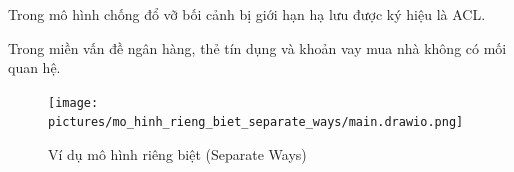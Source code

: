 Trong mô hình chống đổ vỡ bối cảnh bị giới hạn hạ lưu được ký hiệu là ACL.



















\begin{example} Trong miền vấn đề ngân hàng, thẻ tín dụng và khoản vay mua nhà không có mối quan hệ.

    \begin{figure}[H]

        \centering

        \texttt{[image: pictures/mo\_hinh\_rieng\_biet\_separate\_ways/main.drawio.png]}

        \caption{Ví dụ mô hình riêng biệt (Separate Ways)}

    \end{figure}

\end{example}



